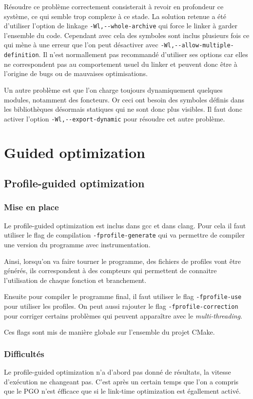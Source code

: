 \documentclass[a4paper]{report}
\begin{document}
Résoudre ce problème correctement consisterait à revoir en profondeur ce système, ce qui semble trop complexe à ce stade.
La solution retenue a été d'utiliser l'option de linkage \verb'-Wl,--whole-archive' qui force le linker à garder l'ensemble du code.
Cependant avec cela des symboles sont inclus plusieurs fois ce qui mène à une erreur que l'on peut désactiver avec \verb'-Wl,--allow-multiple-definition'.
Il n'est normallement pas recommandé d'utiliser ses options car elles ne correspondent pas au comportement usuel du linker et peuvent donc être à l'origine de bugs ou de mauvaises optimisations.

Un autre problème est que l'on charge toujours dynamiquement quelques modules, notamment des foncteurs.
Or ceci ont besoin des symboles définis dans les bibliothèques désormais statiques qui ne sont donc plus visibles.
Il faut donc activer l'option \verb'-Wl,--export-dynamic' pour résoudre cet autre problème.


\section{Guided optimization}

\subsection{Profile-guided optimization}
\subsubsection{Mise en place}
Le profile-guided optimization est inclus dans gcc et dans clang.
Pour cela il faut utiliser le flag de compilation \verb'-fprofile-generate' qui va permettre de compiler une version du programme avec instrumentation.

Ainsi, lorsqu'on va faire tourner le programme, des fichiers de profiles vont être générés, ils correspondent à des compteurs qui permettent de connaitre l'utilisation de chaque fonction et branchement.

Ensuite pour compiler le programme final, il faut utiliser le flag \verb'-fprofile-use' pour utiliser les profiles.
On peut aussi rajouter le flag \verb'-fprofile-correction' pour corriger certains problèmes qui peuvent apparaître avec le \emph{multi-threading}.

Ces flags sont mis de manière globale sur l'ensemble du projet CMake.

\subsubsection{Difficultés}
Le profile-guided optimization n'a d'abord pas donné de résultats, la vitesse d'exécution ne changeant pas.
C'est après un certain temps que l'on a compris que le PGO n'est éfficace que si le link-time optimization est égallement activé.
\end{document}
